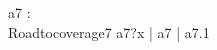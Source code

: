 \begin{circus}
\circchannel a7 : \nat \\
\circprocess Roadtocoverage7 \circdef \circbegin
	\circspot
	    a7?x \then \Skip \lpar | \lchanset a7 \rchanset | \rpar a7.1 \then \Skip
	    \\
	\circend
\end{circus}
